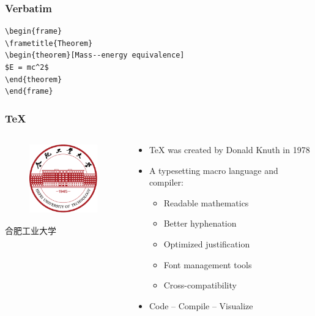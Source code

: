\documentclass[aspectratio=169]{beamer}
\begin{document}
\begin{frame}[fragile] %
\frametitle{Verbatim}
\begin{example}
\begin{verbatim}
\begin{frame}
\frametitle{Theorem}
\begin{theorem}[Mass--energy equivalence]
$E = mc^2$
\end{theorem}
\end{frame}\end{verbatim}
\end{example}
\end{frame}


\begin{frame}
\frametitle{\TeX{}}
\begin{columns}
\begin{column}{4cm}
	\begin{figure}
		\includegraphics[height=3cm]{images/HFUT_badge.pdf}
	\end{figure}
	\begin{center}
		\tiny
		合肥工业大学 \\
	\end{center}
\end{column}
\begin{column}{6cm}
	\begin{itemize}
		\item \TeX{} was created by Donald Knuth in 1978
		\item A typesetting macro language and compiler:
		\begin{itemize}
			\item Readable mathematics
			\item Better hyphenation
			\item Optimized justification
			\item Font management tools
			\item Cross-compatibility
		\end{itemize}
		\item Code -- Compile -- Visualize
	\end{itemize}
\end{column}
\end{columns}
\end{frame}
\end{document}
